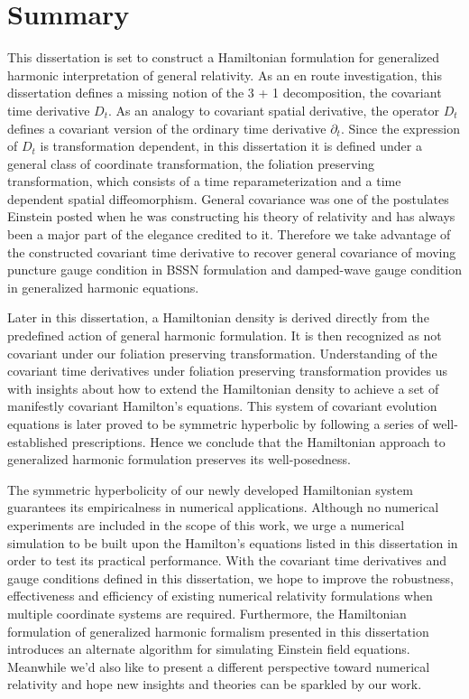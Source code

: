 \chapter{Summary}\label{summary}
This dissertation is set to construct a Hamiltonian formulation for generalized harmonic interpretation of general relativity. As an en route investigation, this dissertation defines a missing notion of the 3 + 1 decomposition, the covariant time derivative $D_{t}$. As an analogy to covariant spatial derivative, the operator $D_{t}$ defines a covariant version of the ordinary time derivative $\partial_{t}$. Since the expression of $D_{t}$ is transformation dependent, in this dissertation it is defined under a general class of coordinate transformation, the foliation preserving transformation, which consists of a time reparameterization and a time dependent spatial diffeomorphism. General covariance was one of the postulates Einstein posted when he was constructing his theory of relativity and has always been a major part of the elegance credited to it. Therefore we take advantage of the constructed covariant time derivative to recover general covariance of moving puncture gauge condition in BSSN formulation and damped-wave gauge condition in generalized harmonic equations. 

Later in this dissertation, a Hamiltonian density is derived directly from the predefined action of general harmonic formulation. It is then recognized as not covariant under our foliation preserving transformation. Understanding of the covariant time derivatives under foliation preserving transformation provides us with insights about how to extend the Hamiltonian density to achieve a set of manifestly covariant Hamilton's equations. This system of covariant evolution equations is later proved to be symmetric hyperbolic by following a series of well-established prescriptions. Hence we conclude that the Hamiltonian approach to generalized harmonic formulation preserves its well-posedness. 

The symmetric hyperbolicity of our newly developed Hamiltonian system guarantees its empiricalness in numerical applications. Although no numerical experiments are included in the scope of this work, we urge a numerical simulation to be built upon the Hamilton's equations listed in this dissertation in order to test its practical performance. With the covariant time derivatives and gauge conditions defined in this dissertation, we hope to improve the robustness, effectiveness and efficiency of existing numerical relativity formulations when multiple coordinate systems are required. Furthermore, the Hamiltonian formulation of generalized harmonic formalism presented in this dissertation introduces an alternate algorithm for simulating Einstein field equations. Meanwhile we'd also like to present a different perspective toward numerical relativity and hope new insights and theories can be sparkled by our work. 